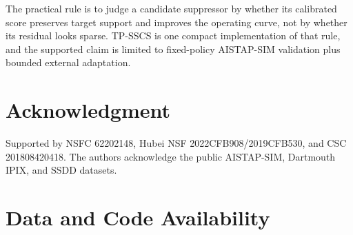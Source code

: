 \documentclass[journal]{IEEEtran}
\begin{document}
The practical rule is to judge a candidate suppressor by whether its calibrated score preserves target support and improves the operating curve, not by whether its residual looks sparse. TP-SSCS is one compact implementation of that rule, and the supported claim is limited to fixed-policy AISTAP-SIM validation plus bounded external adaptation.

\section*{Acknowledgment}

Supported by NSFC 62202148, Hubei NSF 2022CFB908/2019CFB530, and CSC 201808420418. The authors acknowledge the public AISTAP-SIM, Dartmouth IPIX, and SSDD datasets.

\section*{Data and Code Availability}
\end{document}
